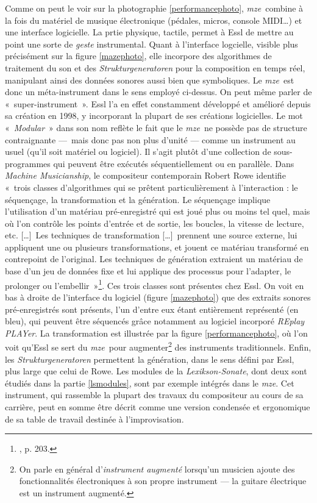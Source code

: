 \documentclass[a4paper,12pt]{article}
\newcommand{\guill}[1]{«~#1~»}
\newcommand{\maze}[0]{\emph{m\symbol{64}ze\textdegree2}}
\newcommand{\tpp}[0]{[\dots]}
\begin{document}
Comme on peut le voir sur la photographie \ref{performancephoto}, \maze~combine à la fois du matériel de musique électronique (pédales, micros, console MIDI\dots) et une interface logicielle. La prtie physique, tactile, permet à Essl de mettre au point une sorte de \emph{geste} instrumental. Quant à l'interface logcielle, visible plus précisément sur la figure \ref{mazephoto}, elle incorpore des algorithmes de traitement du son et des \emph{Strukturgeneratoren} pour la composition en temps réel, manipulant ainsi des données sonores aussi bien que symboliques. Le \maze~est donc un méta-instrument dans le sens employé ci-dessus. On peut même parler de \guill{super-instrument}. Essl l'a en effet constamment développé et amélioré depuis sa création en 1998, y incorporant la plupart de ses créations logicielles. Le mot \guill{\emph{Modular}} dans son nom reflète le fait que le \maze~ne possède pas de structure contraignante ---~mais donc pas non plus d'unité --- comme un instrument au usuel (qu'il soit matériel ou logiciel). Il s'agit plutôt d'une collection de sous-programmes qui peuvent être exécutés séquentiellement ou en parallèle. Dans \emph{Machine Musicianship}, le compositeur contemporain Robert Rowe identifie \guill{trois classes d'algorithmes qui se prêtent particulièrement à l'interaction : le séquençage, la transformation et la génération. Le séquençage implique l'utilisation d'un matériau pré-enregistré qui est joué plus ou moins tel quel, mais où l'on contrôle les points d'entrée et de sortie, les boucles, la vitesse de lecture, etc. \tpp~Les techniques de transformation \tpp~prennent une source externe, lui appliquent une ou plusieurs transformations, et jouent ce matériau transformé en contrepoint de l'original. Les techniques de génération extraient un matériau de base d'un jeu de données fixe et lui applique des processus pour l'adapter, le prolonger ou l'embellir}\footnote{\cite{machinemusicianship}, p. 203.}. Ces trois classes sont présentes chez Essl. On voit en bas à droite de l'interface du logiciel (figure \ref{mazephoto}) que des extraits sonores pré-enregistrés sont présents, l'un d'entre eux étant entièrement représenté (en bleu), qui peuvent être séquencés grâce notamment au logiciel incorporé \emph{REplay PLAYer}. La transformation est illustrée par la figure \ref{performancephoto}, où l'on voit qu'Essl se sert du \maze~pour augmenter\footnote{On parle en général d'\emph{instrument augmenté} lorsqu'un musicien ajoute des fonctionnalités électroniques à son propre instrument --- la guitare électrique est un instrument augmenté.} des instruments traditionnels. Enfin, les \emph{Strukturgeneratoren} permettent la génération, dans le sens défini par Essl, plus large que celui de Rowe. Les modules de la \emph{Lexikson-Sonate}, dont deux sont étudiés dans la partie \ref{lsmodules}, sont par exemple intégrés dans le \maze. Cet instrument, qui rassemble la plupart des travaux du compositeur au cours de sa carrière, peut en somme être décrit comme une version condensée et ergonomique de sa table de travail destinée à l'improvisation.
\end{document}
